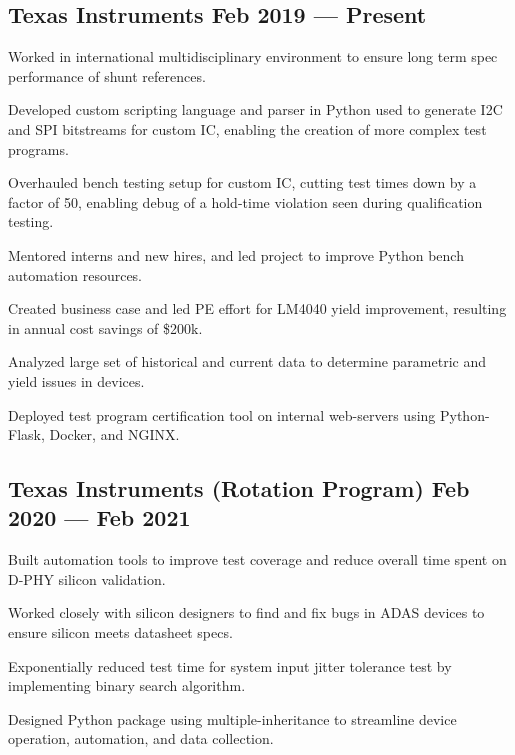 \documentclass[letter,10pt]{article}
\begin{document}
\subsection{{Texas Instruments \hfill Feb 2019 --- Present}}
\begin{zitemize}
\item Worked in international multidisciplinary environment to ensure long term spec performance of shunt references.
\item Developed custom scripting language and parser in Python used to generate I2C and SPI bitstreams for custom IC, enabling the creation of more complex test programs. 
\item Overhauled bench testing setup for custom IC, cutting test times down by a factor of 50, enabling debug of a hold-time violation seen during qualification testing. 
\item Mentored interns and new hires, and led project to improve Python bench automation resources. 
\item Created business case and led PE effort for LM4040 yield improvement, resulting in annual cost savings of \$200k. 
\item Analyzed large set of historical and current data to determine parametric and yield issues in devices. 
\item Deployed test program certification tool on internal web-servers using Python-Flask, Docker, and NGINX.
\end{zitemize}

\subsection{{Texas Instruments (Rotation Program) \hfill Feb 2020 --- Feb 2021}}
\begin{zitemize}
\item Built automation tools to improve test coverage and reduce overall time spent on D-PHY silicon validation.
\item Worked closely with silicon designers to find and fix bugs in ADAS devices to ensure silicon meets datasheet specs.
\item Exponentially reduced test time for system input jitter tolerance test by implementing binary search algorithm. 
\item Designed Python package using multiple-inheritance to streamline device operation, automation, and data collection.
\end{zitemize}
\end{document}
